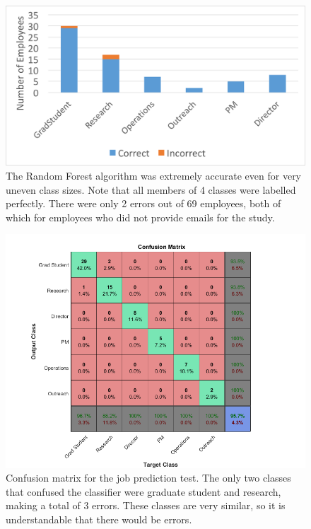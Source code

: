 \documentclass[12pt]{report}
\begin{document}
\begin{figure}[t]
    \centering
    \includegraphics[width=\columnwidth,trim={1mm 2mm 1mm 3mm},clip]{Prediction_50_50_RF}
    \vspace{-20pt}
    \caption[Classification results]{The Random Forest algorithm was extremely accurate even for very uneven class sizes.  Note that all members of 4 classes were labelled perfectly.  There were only 2 errors out of 69 employees, both of which for employees who did not provide emails for the study.}
    \label{fig:result_hist}
\end{figure}


\begin{figure}[t]
    \centering
        \includegraphics[width=.9\columnwidth,trim={1mm 6mm 1mm 3.5mm},clip]{class_confusion_mat}
        \vspace{-7pt}
        \caption[Job title prediction confusion matrix]{Confusion matrix for the job prediction test.  The only two classes that confused the classifier were graduate student and research, making a total of 3 errors.  These classes are very similar, so it is understandable that there would be errors.}
        \label{fig:conf_matrix}
\end{figure}
\end{document}
